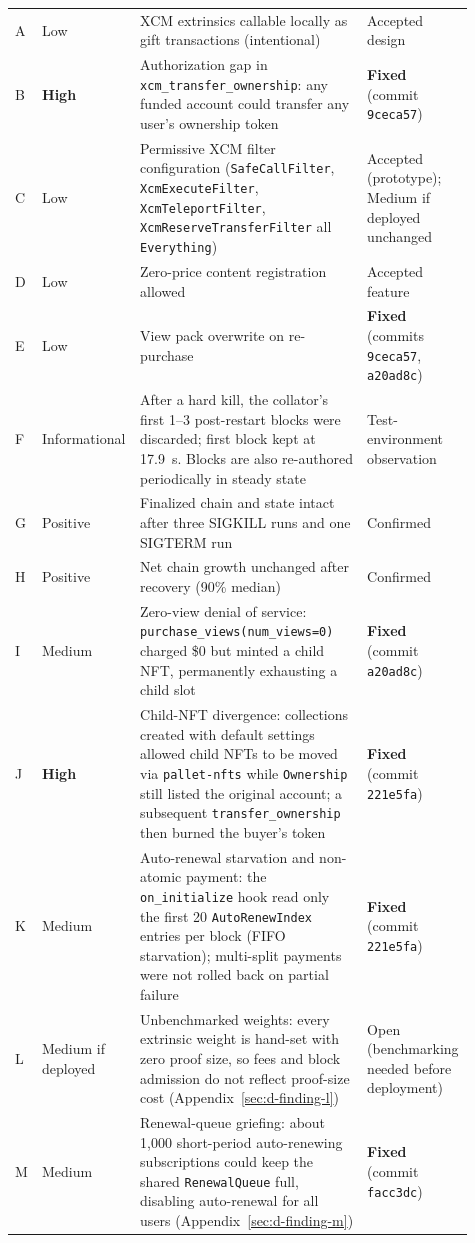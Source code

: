 \begin{longtable}{@{}L{0.04\linewidth} L{0.16\linewidth} L{0.49\linewidth} L{0.22\linewidth}@{}}
A & Low & XCM extrinsics callable locally as gift transactions (intentional) & Accepted design \\
\addlinespace
B & \textbf{High} & Authorization gap in \texttt{xcm\_transfer\_ownership}: any funded account could transfer any user's ownership token & \textbf{Fixed} (commit \texttt{9ceca57}) \\
\addlinespace
C & Low & Permissive XCM filter configuration (\texttt{SafeCallFilter}, \texttt{XcmExecuteFilter}, \texttt{XcmTeleportFilter}, \texttt{XcmReserveTransferFilter} all \texttt{Everything}) & Accepted (prototype); Medium if deployed unchanged \\
\addlinespace
D & Low & Zero-price content registration allowed & Accepted feature \\
\addlinespace
E & Low & View pack overwrite on re-purchase & \textbf{Fixed} (commits \texttt{9ceca57}, \texttt{a20ad8c}) \\
\addlinespace
F & Informational & After a hard kill, the collator's first 1--3 post-restart blocks were discarded; first block kept at 17.9~s. Blocks are also re-authored periodically in steady state & Test-environment observation \\
\addlinespace
G & Positive & Finalized chain and state intact after three SIGKILL runs and one SIGTERM run & Confirmed \\
\addlinespace
H & Positive & Net chain growth unchanged after recovery (90\% median) & Confirmed \\
\addlinespace
I & Medium & Zero-view denial of service: \texttt{purchase\_views(num\_views=0)} charged \$0 but minted a child NFT, permanently exhausting a child slot & \textbf{Fixed} (commit \texttt{a20ad8c}) \\
\addlinespace
J & \textbf{High} & Child-NFT divergence: collections created with default settings allowed child NFTs to be moved via \texttt{pallet-nfts} while \texttt{Ownership} still listed the original account; a subsequent \texttt{transfer\_ownership} then burned the buyer's token & \textbf{Fixed} (commit \texttt{221e5fa}) \\
\addlinespace
K & Medium & Auto-renewal starvation and non-atomic payment: the \texttt{on\_initialize} hook read only the first 20 \texttt{AutoRenewIndex} entries per block (FIFO starvation); multi-split payments were not rolled back on partial failure & \textbf{Fixed} (commit \texttt{221e5fa}) \\
\addlinespace
L & Medium if deployed & Unbenchmarked weights: every extrinsic weight is hand-set with zero proof size, so fees and block admission do not reflect proof-size cost (Appendix~\ref{sec:d-finding-l}) & Open (benchmarking needed before deployment) \\
\addlinespace
M & Medium & Renewal-queue griefing: about 1,000 short-period auto-renewing subscriptions could keep the shared \texttt{RenewalQueue} full, disabling auto-renewal for all users (Appendix~\ref{sec:d-finding-m}) & \textbf{Fixed} (commit \texttt{facc3dc}) \\
\end{longtable}

